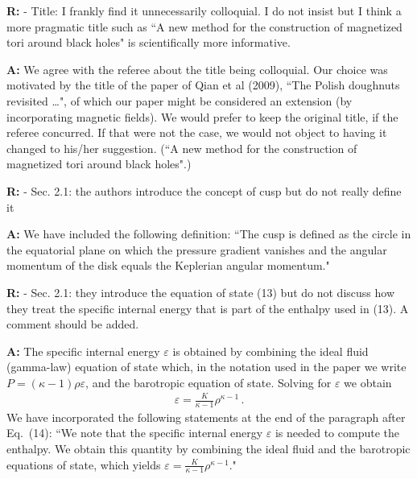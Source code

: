 \documentclass{article}
\begin{document}
\bigskip

{\bf R:} - Title: I frankly find it unnecessarily colloquial. I do not insist but
I think a more pragmatic title such as ``A new method for the
construction of magnetized tori around black holes" is scientifically
more informative.

\bigskip

{\bf A:} We agree with the referee about the title being colloquial. Our choice was
motivated by the title of the paper of Qian et al (2009), ``The Polish 
doughnuts revisited …", of which our paper might be considered an extension 
(by incorporating magnetic fields). We would prefer to keep the original 
title, if the referee concurred. If that were not the case, we would not
object to having it changed to his/her suggestion. (``A new method for the
construction of magnetized tori around black holes".)

\bigskip

{\bf R:} - Sec. 2.1: the authors introduce the concept of cusp but do not really
define it

\bigskip

{\bf A:} We have included the following definition: ``The cusp is defined as the circle 
in the equatorial plane on which the pressure gradient vanishes and the angular 
momentum of the disk equals the Keplerian angular momentum." 

\bigskip

{\bf R:} - Sec. 2.1: they introduce the equation of state (13) but do not discuss
how they treat the specific internal energy that is part of the
enthalpy used in (13). A comment should be added.

\bigskip

{\bf A:} The specific internal energy $\varepsilon$ is obtained by combining the ideal fluid (gamma-law)
equation of state which, in the notation used in the paper we write $P=(\kappa-1)\rho\varepsilon$,
and the barotropic equation of state. Solving for $\varepsilon$ we obtain
\begin{eqnarray*}
\varepsilon=\frac{K}{\kappa-1}\rho^{\kappa-1}\,.
\end{eqnarray*}
We have incorporated the following statements at the end of the paragraph after Eq.~(14):
``We note that the specific internal energy $\varepsilon$ is needed to compute the enthalpy. We obtain
this quantity by combining the ideal fluid and the barotropic equations of state, which yields 
$\varepsilon=\frac{K}{\kappa-1}\rho^{\kappa-1}$."

\bigskip
\end{document}
